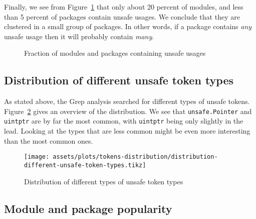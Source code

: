 Finally, we see from Figure~\ref{fig:fraction-of-unsafe-modules-and-packages} that only about 20 percent of modules, and
less than 5 percent of packages contain unsafe usages.
We conclude that they are clustered in a small group of packages.
In other words, if a package contains \textit{any} unsafe usage then it will probably contain \textit{many}.

\begin{figure}[ht]
    \centering
    \caption{Fraction of modules and packages containing unsafe usages}
    \label{fig:fraction-of-unsafe-modules-and-packages}
\end{figure}



\subsection{Distribution of different unsafe token types}\label{subsec:results-tokens-distribution}

As stated above, the Grep analysis searched for different types of unsafe tokens.
Figure~\ref{fig:unsafe-tokens-distribution} gives an overview of the distribution.
We see that \texttt{unsafe.Pointer} and \texttt{uintptr} are by far the most common, with \texttt{uintptr} being only
slightly in the lead.
Looking at the types that are less common might be even more interesting than the most common ones.

\begin{figure}[ht]
    \centering
    {\scriptsize \texttt{[image: assets/plots/tokens-distribution/distribution-different-unsafe-token-types.tikz]}}
    \caption{Distribution of different types of unsafe token types}
    \label{fig:unsafe-tokens-distribution}
\end{figure}



\subsection{Module and package popularity}\label{subsec:results-popularity}


